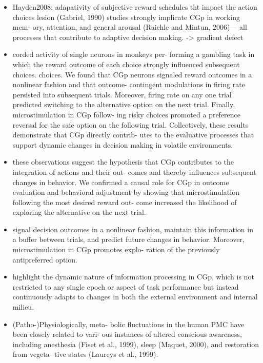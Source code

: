 \documentclass{article} %
\begin{document}
\begin{itemize}
\begin{itemize}
\item
Hayden2008: adapativity of subjective reward schedules tht impact the action choices
 lesion (Gabriel, 1990) studies strongly implicate CGp in working mem- ory, attention, and general arousal (Raichle and Mintun, 2006)— all processes that contribute to adaptive decision making. -> gradient defect

\item
corded activity of single neurons in monkeys per- forming a gambling task in which the reward outcome of each choice strongly influenced subsequent choices.
choices. We found that CGp neurons signaled reward outcomes in a nonlinear fashion and that outcome- contingent modulations in firing rate persisted into subsequent trials. Moreover, firing rate on any one trial predicted switching to the alternative option on the next trial. Finally, microstimulation in CGp follow- ing risky choices promoted a preference reversal for the safe option on the following trial. Collectively, these results demonstrate that CGp directly contrib- utes to the evaluative processes that support dynamic changes in decision making in volatile environments.

\item
 these observations suggest the hypothesis that CGp contributes to the integration of actions and their out- comes and thereby influences subsequent changes in behavior.
 We confirmed a causal role for CGp in outcome evaluation and behavioral adjustment by showing that microstimulation following the most desired reward out- come increased the likelihood of exploring the alternative on the next trial.

 \item
signal decision outcomes in a nonlinear fashion, maintain this information in a buffer between trials, and predict future changes in behavior. Moreover, microstimulation in CGp promotes explo- ration of the previously antipreferred option.

\item
highlight the dynamic nature of information processing in CGp, which is not restricted to any single epoch or aspect of task performance but instead continuously adapts to changes in both the external environment and internal milieu.


\item
(Patho-)Physiologically, meta- bolic fluctuations in the human PMC have been closely related to vari- ous instances of altered conscious awareness, including anesthesia (Fiset et al., 1999), sleep (Maquet, 2000), and restoration from vegeta- tive states (Laureys et al., 1999).


\end{itemize}
\end{itemize}
\end{document}
